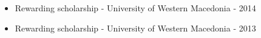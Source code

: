 


\begin{itemize}[before=\color{black}]
\item{Rewarding scholarship - University of Western Macedonia - 2014}
\item{Rewarding scholarship - University of Western Macedonia - 2013}
\end{itemize}

